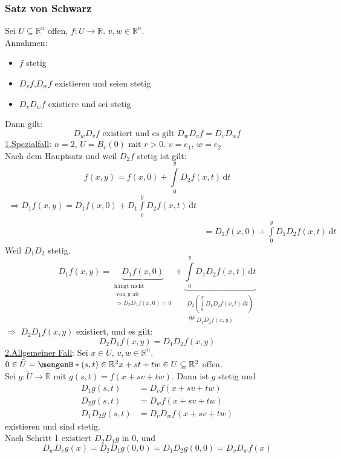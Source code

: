 \subsubsection{Satz von Schwarz} %
\label{ssub:satz_von_schwarz}
Sei $U \subseteq \mathbb{R}^n$ offen, $f: U \to \mathbb{R}$. $v,w \in \mathbb{R}^n$.\\
Annahmen: \begin{itemize}
	\item $f$ stetig
	\item $D_vf$,$D_wf$ existieren und seien stetig
	\item $D_vD_wf$ existiere und sei stetig
\end{itemize}
Dann gilt:
\[
	D_wD_vf \text{ existiert und es gilt } D_wD_vf= D_vD_wf
\]
\underline{1.Spezialfall}: $n=2$, $U=B_r(0)$ mit $r>0$. $v=e_1$, $w=e_2$ \\
Nach dem Hauptsatz und weil $D_2f$ stetig ist gilt:
\[
	f(x,y)= f(x,0)+\int\limits_{0}^{y}D_2f(x,t) \,\mathrm{d}t
\]
\begin{align*}
	\Rightarrow D_1f(x,y)=D_1f(x,0)+D_1 \int\limits_{0}^{y}D_2f(x,t) \,\mathrm{d}t \\
	&=D_1f(x,0)+ \int\limits_{0}^{y}D_1D_2f(x,t) \,\mathrm{d}t
\end{align*}
Weil $D_1D_2$ stetig.
\[
	D_1f(x,y)=\underset{\substack{\text{hängt nicht} \\\text{ von $y$ ab} \\ \Rightarrow D_2D_1f(x,0)=0}}{\underbrace{D_1f(x,0)}}+ \underset{\substack{D_2 \left( \int\limits_{0}^{y}D_1D_2f(x,t) \,\mathrm{d}t \right) \\ \stackrel{HS}{=}D_1D_2f(x,y) }}{\underbrace{\int\limits_{0}^{y}D_1D_2f(x,t) \,\mathrm{d}t}}
\]
$\Rightarrow$ $D_2D_1f(x,y)$ existiert, und es gilt:
\[
	D_2D_1f(x,y)= D_1D_2f(x,y)
\]
\underline{2.Allgemeiner Fall}: Sei $x \in U$, $v,w \in \mathbb{R}^n$. \\
$0 \in \tilde U= \set[(s,t)\in \mathbb{R}^2]{x+st+tw \in U} \subseteq \mathbb{R}^2$ offen. \\
Sei $g:\tilde U \to \mathbb{R}$ mit $g(s,t)=f(x+sv+tw)$. Dann ist $g$ stetig und
\begin{align*}
	D_1g(s,t) &= D_vf(x+sv+tw) \\
	D_2g(s,t) &= D_wf(x+sv+tw) \\
	D_1D_2g(s,t) &= D_vD_wf(x+sv+tw)
\end{align*}
existieren und sind stetig. \\
Nach Schritt 1 existiert $D_2D_1g$ in $0$, und $$D_wD_vg(x)= D_2D_1g(0,0)=D_1D_2g(0,0)=D_vD_wf(x)$$
\bewende
